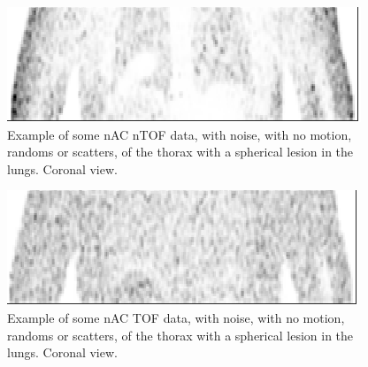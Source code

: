                 \begin{figure}
                    \centering
                    
                    \includegraphics[width=1.0\linewidth]{figures/background_non_tof_example.png}
                    
                    \captionsetup{singlelinecheck=false, justification=raggedright}
                    \caption{Example of some \gls{nAC} \gls{nTOF} data, with noise, with no motion, randoms or scatters, of the thorax with a spherical lesion in the lungs. Coronal view.} \label{fig:time_of_flight_pet_non_tof_example}
                \end{figure}
                
                \begin{figure}
                    \centering
                    
                    \includegraphics[width=1.0\linewidth]{figures/background_tof_example.png}
                    
                    \captionsetup{singlelinecheck=false, justification=raggedright}
                    \caption{Example of some \gls{nAC} \gls{TOF} data, with noise, with no motion, randoms or scatters, of the thorax with a spherical lesion in the lungs. Coronal view.} \label{fig:time_of_flight_pet_tof_example}
                \end{figure}
                
